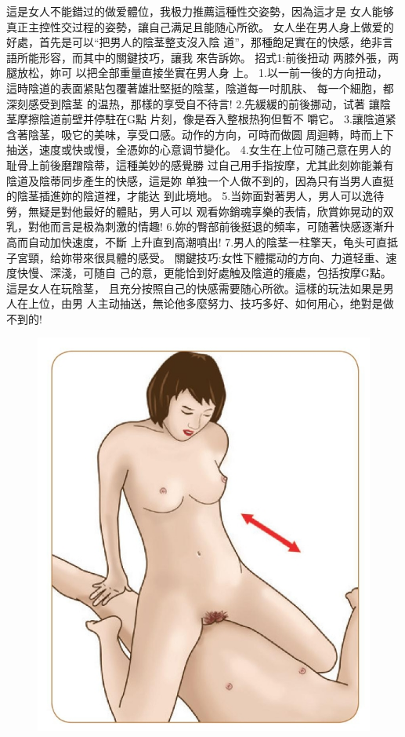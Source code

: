 \documentclass[12pt,UTF8]{ctexbook}
\begin{document}
這是女人不能錯过的做爱體位，我极力推薦這種性交姿勢，因為這才是
女人能够真正主控性交过程的姿勢，讓自己满足且能随心所欲。
女人坐在男人身上做爱的好處，首先是可以“把男人的陰茎整支沒入陰
道”，那種飽足實在的快感，绝非言語所能形容，而其中的關鍵技巧，讓我
來告訴妳。
招式1:前後扭动
两膝外張，两腿放松，妳可
以把全部重量直接坐實在男人身
上。
1.以一前一後的方向扭动，
這時陰道的表面紧貼包覆著雄壯堅挺的陰茎，陰道每一吋肌肤、
每一个細胞，都深刻感受到陰茎
的温热，那樣的享受自不待言!
2.先緩緩的前後挪动，试著
讓陰茎摩擦陰道前壁并停駐在G點
片刻，像是吞入整根热狗但暫不
嚼它。
3.讓陰道紧含著陰茎，吸它的美味，享受口感。动作的方向，可時而做圆
周迴轉，時而上下抽送，速度或快或慢，全憑妳的心意调节變化。
4.女生在上位可随己意在男人的耻骨上前後磨蹭陰蒂，這種美妙的感覺勝
过自己用手指按摩，尤其此刻妳能兼有陰道及陰蒂同步產生的快感，這是妳
单独一个人做不到的，因為只有当男人直挺的陰茎插進妳的陰道裡，才能达
到此境地。
5.当妳面對著男人，男人可以逸待勞，無疑是對他最好的體貼，男人可以
观看妳銷魂享樂的表情，欣賞妳晃动的双乳，對他而言是极為刺激的情趣!
6.妳的臀部前後挺退的頻率，可随著快感逐漸升高而自动加快速度，不斷
上升直到高潮噴出!
7.男人的陰茎一柱擎天，龟头可直抵子宮頸，给妳带來很具體的感受。
關鍵技巧:女性下體擺动的方向、力道轻重、速度快慢、深淺，可随自
己的意，更能恰到好處触及陰道的癢處，包括按摩G點。這是女人在玩陰茎，
且充分按照自己的快感需要随心所欲。這樣的玩法如果是男人在上位，由男
人主动抽送，無论他多麼努力、技巧多好、如何用心，绝對是做不到的!

\begin{figure}[htbp]
	\centering
	\includegraphics[width=0.7\linewidth]{24}
	\caption{}
	\label{fig:1}
\end{figure}
\end{document}
